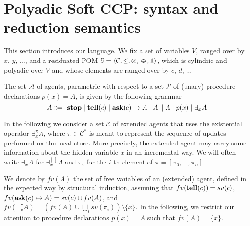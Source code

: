 \documentclass{llncs}
\def\1{{\mathbf 1}}
\newcommand{\tell}{{\bf tell}}
\newcommand{\ask}{{\bf ask}}
\newcommand{\ostop}{{\bf stop}}
\def\1{{\mathbf 1}}
\def\odiv{\, {\ominus\hspace{-7.7pt} \div} \,}
\begin{document}
\section{Polyadic Soft CCP: syntax and reduction semantics}\label{sec:detpolyadicCCP}
This section introduces our language.
We fix a set of variables $V$, ranged over by $x$, $y$, $\ldots$, and 
a residuated POM $\mathbb S = \langle {\mathcal C}, \leq, \otimes, \odiv, \1\rangle$, 
which is cylindric and polyadic over $V$ and whose elements
are ranged over by $c$, $d$, $\ldots$

\begin{definition}[Agents]%
The set $\mathcal{A}$ of agents, %
parametric with respect to a set $\mathcal{P}$ of (unary) procedure declarations $p(x) = A$,
is given by the following grammar
\[ A \Coloneqq \: \: \mathit{\ostop} \mid \textit{\tell}(c)  \mid \textit{\ask}(c) \mapsto A \mid A \parallel A \mid %
p(x) \mid \exists_x A\]  
\end{definition}

In the following we consider 
a set $\mathcal{E}$ of extended agents that uses the existential operator $\exists^{\pi}_x A$, 
where $\pi \in {\mathcal C}^\ast$ is meant to represent the sequence of updates performed on the local store. 
More precisely, the extended agent may carry some information about the hidden variable 
$x$ in an incremental way. We will often write $\exists_x A$ for $\exists^{[ \,]}_x A$ and $\pi_i$ for 
the $i$-th element of $\pi = [ \pi_0, \ldots, \pi_n]$.

We denote by $fv(A)$ the set of free variables of an (extended) agent, defined in the expected way 
by structural induction, assuming that $fv(\tell(c)) = sv(c)$,
$fv(\ask(c) \mapsto A) = sv(c) \cup fv(A)$,
and $fv(\exists^{\pi}_x A) = (fv(A) \cup \bigcup_i sv(\pi_i)) \setminus \{x\}$.
%
In the following, we restrict our attention to 
procedure declarations $p(x) = A$ such that $fv(A) = \{x\}$.
\end{document}
